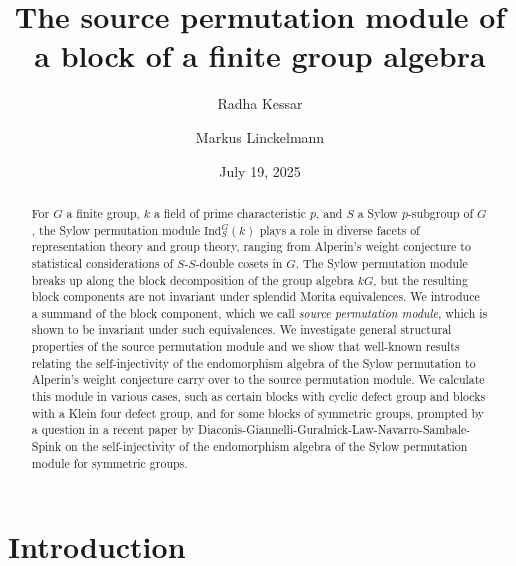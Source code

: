 \documentclass{amsart}
\title{The source permutation module of a block of a finite group algebra}
\author{Radha Kessar}
\author{Markus Linckelmann}
\date{July 19, 2025}
\theoremstyle{plain}\newtheorem{Theorem}{Theorem}[section]
\theoremstyle{plain}\newtheorem{Conjecture}[Theorem]{Conjecture}
\theoremstyle{plain}\newtheorem{Corollary}[Theorem]{Corollary}
\theoremstyle{plain}\newtheorem{Lemma}[Theorem]{Lemma}
\theoremstyle{plain}\newtheorem{Proposition}[Theorem]{Proposition}
\theoremstyle{definition}\newtheorem{Definition}[Theorem]{Definition}
\theoremstyle{definition}\newtheorem{Example}[Theorem]{Example}
\theoremstyle{definition}\newtheorem{Examples}[Theorem]{Examples}
\theoremstyle{definition}\newtheorem{Exercise}[Theorem]{Exercise}
\theoremstyle{definition}\newtheorem{Notation}[Theorem]{Notation}
\theoremstyle{definition}\newtheorem{Remark}[Theorem]{Remark}
\theoremstyle{definition}\newtheorem{Remarks}[Theorem]{Remarks}
\theoremstyle{plain}\newtheorem{Statement}[Theorem]{}
\def\Ind{\mathrm{Ind}}    \def\tenC{\otimes_C}
\begin{document}
\begin{abstract}
For $G$ a finite group, $k$ a field of prime characteristic $p$, and $S$ a 
Sylow $p$-subgroup of $G$,  the Sylow permutation module $\Ind^G_S(k)$ 
plays a role in  diverse facets  of  representation theory and group theory, 
ranging from Alperin's weight conjecture to statistical considerations of 
$S$-$S$-double cosets in $G$. The Sylow permutation module breaks up along the
block decomposition of the group algebra $kG$, but the resulting block components 
are not   invariant under splendid Morita equivalences. We introduce a summand of the block component, 
which we  call {\em source permutation module}, which  is shown to be invariant  under such equivalences. 
We investigate   general structural properties of the source permutation module 
 and  we show that well-known results relating the self-injectivity of
the endomorphism algebra of the Sylow permutation to Alperin's weight conjecture 
carry over to the source permutation module. We calculate this module in various 
cases, such as certain blocks with cyclic defect group and blocks with a Klein four 
defect group, and for some blocks of symmetric groups, prompted by a question 
in a recent paper by Diaconis-Giannelli-Guralnick-Law-Navarro-Sambale-Spink  
on  the  self-injectivity  of  the endomorphism algebra of  the  Sylow permutation 
module for symmetric groups.
 \end{abstract}



\maketitle

\section{Introduction}%
\end{document}
